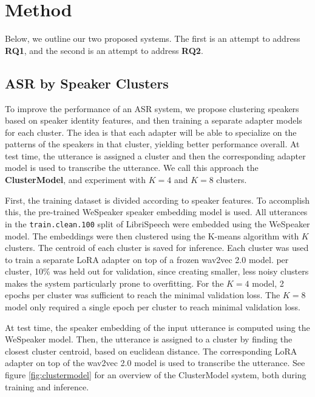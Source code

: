 \section{Method}

Below, we outline our two proposed systems.
The first is an attempt to address \textbf{RQ1}, and the second is an attempt to address \textbf{RQ2}.

\subsection{ASR by Speaker Clusters}

To improve the performance of an ASR system, we propose clustering speakers based on speaker identity features, 
and then training a separate adapter models for each cluster.
The idea is that each adapter will be able to specialize on the patterns of the speakers in that cluster, yielding better performance overall.
At test time, the utterance is assigned a cluster and then the corresponding adapter model is used to transcribe the utterance.
We call this approach the \textbf{ClusterModel}, and experiment with $K=4$ and $K=8$ clusters.

First, the training dataset is divided according to speaker features. To accomplish this, the pre-trained WeSpeaker \cite{wespeaker} speaker embedding model is used.
All utterances in the \verb|train.clean.100| split of LibriSpeech \cite{librispeech} were embedded using the WeSpeaker model.
The embeddings were then clustered using the K-means algorithm with $K$ clusters. 
The centroid of each cluster is saved for inference.
Each cluster was used to train a separate LoRA adapter on top of a frozen wav2vec 2.0 \cite{wav2vec2} model.
per cluster, 10\% was held out for validation, since creating smaller, less noisy clusters makes the system particularly prone to overfitting.
For the $K=4$ model, 2 epochs per cluster was sufficient to reach the minimal validation loss.
The $K=8$ model only required a single epoch per cluster to reach minimal validation loss.

At test time, the speaker embedding of the input utterance is computed using the WeSpeaker model.
Then, the utterance is assigned to a cluster by finding the closest cluster centroid, based on euclidean distance.
The corresponding LoRA adapter on top of the wav2vec 2.0 model is used to transcribe the utterance.
See figure \ref{fig:clustermodel} for an overview of the ClusterModel system, both during training and inference.

